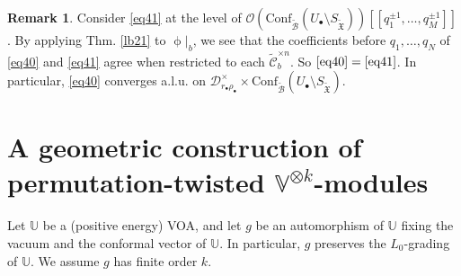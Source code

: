 \documentclass[12pt,a4paper,notitlepage]{article}
\theoremstyle{definition}
\newtheorem{rem}[df]{Remark}
\theoremstyle{plain}
\newcommand{\fk}{\mathfrak}
\newcommand{\mc}{\mathcal}
\newcommand{\wtd}{\widetilde}
\newcommand{\Conf}{\mathrm{Conf}}
\newcommand{\scr}{\mathscr}
\newcommand{\blt}{\bullet}
\newcommand{\Vbb}{\mathbb V}
\newcommand{\Ubb}{\mathbb U}
\newcommand{\SXtd}{S_{\wtd{\fk X}}}
\numberwithin{equation}{section}
\begin{document}
\begin{rem}
Consider \eqref{eq41} at the level of $\scr O(\Conf_{\wtd{\mc B}}(U_\blt\setminus\SXtd))[[q_1^{\pm 1},\dots,q_M^{\pm 1}]]$. By applying Thm. \ref{lb21} to $\upphi|_b$, we see that the coefficients before $q_1,\dots,q_N$ of \eqref{eq40} and \eqref{eq41} agree when restricted to each $\wtd{\mc C}_b^{\times n}$. So $\eqref{eq40}=\eqref{eq41}$. In particular, \eqref{eq40} converges a.l.u. on $\mc D_{r_\blt\rho_\blt}^\times\times\Conf_{\wtd{\mc B}}(U_\blt\setminus\SXtd)$.
\end{rem}





\section{A geometric construction of permutation-twisted $\Vbb^{\otimes k}$-modules}\label{lb24}



Let $\Ubb$ be a (positive energy) VOA, and let $g$ be an automorphism of $\Ubb$ fixing the vacuum and the conformal vector of $\Ubb$. In particular, $g$ preserves the $L_0$-grading of $\Ubb$. We assume $g$ has finite order $k$. 
\end{document}
